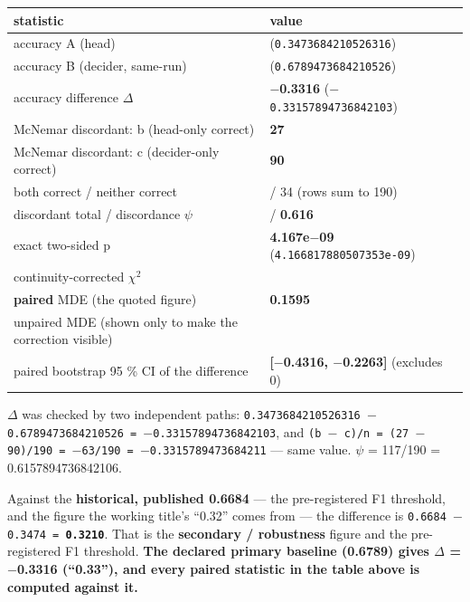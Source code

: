 \documentclass[10pt]{article}
\begin{document}
\begin{center}
\begin{tabular}{@{}>{\raggedright\arraybackslash}p{}>{\raggedright\arraybackslash}p{}@{}}
\hline
\textbf{statistic} & \textbf{value} \\ \hline
accuracy A (head) & 0.3474 (\texttt{0.3473684210526316}) \\ \hline
accuracy B (decider, same-run) & 0.6789 (\texttt{0.6789473684210526}) \\ \hline
accuracy difference $\Delta$ & \textbf{$-$0.3316} (\texttt{$-$0.33157894736842103}) \\ \hline
McNemar discordant: b (head-only correct) & \textbf{27} \\ \hline
McNemar discordant: c (decider-only correct) & \textbf{90} \\ \hline
both correct / neither correct & 39 / 34 (rows sum to 190) \\ \hline
discordant total / discordance $\psi$ & 117 / \textbf{0.616} \\ \hline
exact two-sided p & \textbf{4.167e$-$09} (\texttt{4.166817880507353e-09}) \\ \hline
continuity-corrected $\chi$$^{2}$ & 32.85 \\ \hline
\textbf{paired} MDE (the quoted figure) & \textbf{0.1595} \\ \hline
unpaired MDE (shown only to make the correction visible) & 0.1355 \\ \hline
paired bootstrap 95 \% CI of the difference & \textbf{[$-$0.4316, $-$0.2263]} (excludes 0) \\ \hline
\end{tabular}
\end{center}

$\Delta$ was checked by two independent paths: \texttt{0.3473684210526316 $-$ 0.6789473684210526 = $-$0.33157894736842103}, and \texttt{(b $-$ c)/n = (27 $-$ 90)/190 = $-$63/190 = $-$0.3315789473684211} --- same value. $\psi$ = 117/190 = 0.6157894736842106.

Against the \textbf{historical, published 0.6684} --- the pre-registered F1 threshold, and the figure the working title's ``0.32'' comes from --- the difference is \texttt{0.6684 $-$ 0.3474 = \textbf{0.3210}}. That is the \textbf{secondary / robustness} figure and the pre-registered F1 threshold. \textbf{The declared primary baseline (0.6789) gives $\Delta$ = $-$0.3316 (``0.33''), and every paired statistic in the table above is computed against it.}
\end{document}
